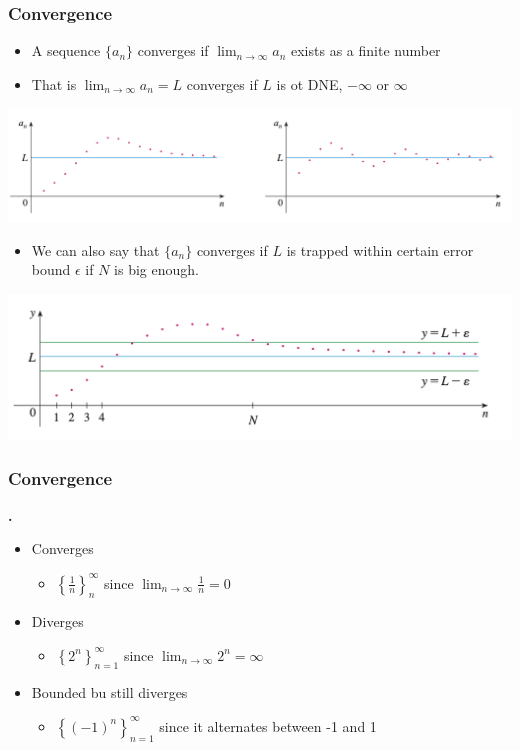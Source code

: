 \documentclass[t]{beamer}
\theoremstyle{plain}
\theoremstyle{definition}
\newcounter{heading}
\newcommand{\newhead}[1]{\medskip\stepcounter{heading}\noindent\textbf{\hspace{0.2cm}{#1}.}}
\begin{document}
\begin{frame}
\frametitle{Convergence}

\begin{itemize}
	\item A sequence $\{a_n\}$ converges if $\displaystyle\lim_{n \to \infty} a_n$ exists as a finite number
	\item That is $\displaystyle\lim_{n \to \infty} a_n = L$ converges if $L$ is ot DNE, $-\infty$ or $\infty$
\end{itemize}

 \includegraphics[scale=0.35]{fig/convergence}
 
 \begin{itemize}
	\item We can also say that $\{a_n\}$ converges if $L$ is trapped within certain error bound $\epsilon$ if $N$ is big enough.
\end{itemize}

 \includegraphics[scale=0.35]{fig/convergence2}

\end{frame}

\begin{frame}

\frametitle{Convergence}

\newhead{Examples}

\begin{itemize}
	\item Converges
	\begin{itemize}
		\item $\left\{\frac{1}{n}\right\}_n^\infty$ since $\displaystyle\lim_{n \to \infty}  \frac{1}{n} = 0$
	\end{itemize}
	\item Diverges
	\begin{itemize}
		\item $\left\{ 2^n \right\}_{n=1}^{\infty}$ since $\displaystyle\lim_{n \to \infty}  2^n = \infty$
	\end{itemize}
	\item Bounded bu still diverges
	\begin{itemize}
		\item $\left\{ (-1)^{n}\right\}_{n=1}^{\infty}$ since it alternates between -1 and 1
	\end{itemize}
\end{itemize}

\end{frame}
\end{document}
